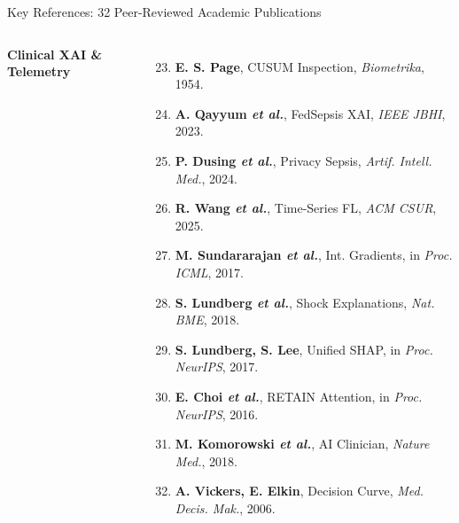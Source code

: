 \documentclass[aspectratio=169, 10pt]{beamer}
\begin{document}
\begin{frame}{Key References: 32 Peer-Reviewed Academic Publications}
\begin{columns}[T]
        {\fontsize{4.8pt}{5.8pt}\selectfont
        \textbf{\textcolor{amritaMaroon}{Clinical XAI \& Telemetry}}
        \begin{enumerate}
            \setcounter{enumi}{22}
            \setlength\itemsep{0.14em}
            \item \textbf{E. S. Page}, CUSUM Inspection, \textit{Biometrika}, 1954.
            \item \textbf{A. Qayyum \textit{et al.}}, FedSepsis XAI, \textit{IEEE JBHI}, 2023.
            \item \textbf{P. Dusing \textit{et al.}}, Privacy Sepsis, \textit{Artif. Intell. Med.}, 2024.
            \item \textbf{R. Wang \textit{et al.}}, Time-Series FL, \textit{ACM CSUR}, 2025.
            \item \textbf{M. Sundararajan \textit{et al.}}, Int. Gradients, in \textit{Proc. ICML}, 2017.
            \item \textbf{S. Lundberg \textit{et al.}}, Shock Explanations, \textit{Nat. BME}, 2018.
            \item \textbf{S. Lundberg, S. Lee}, Unified SHAP, in \textit{Proc. NeurIPS}, 2017.
            \item \textbf{E. Choi \textit{et al.}}, RETAIN Attention, in \textit{Proc. NeurIPS}, 2016.
            \item \textbf{M. Komorowski \textit{et al.}}, AI Clinician, \textit{Nature Med.}, 2018.
            \item \textbf{A. Vickers, E. Elkin}, Decision Curve, \textit{Med. Decis. Mak.}, 2006.
        \end{enumerate}
        }
    \end{columns}
\end{frame}
\end{document}
